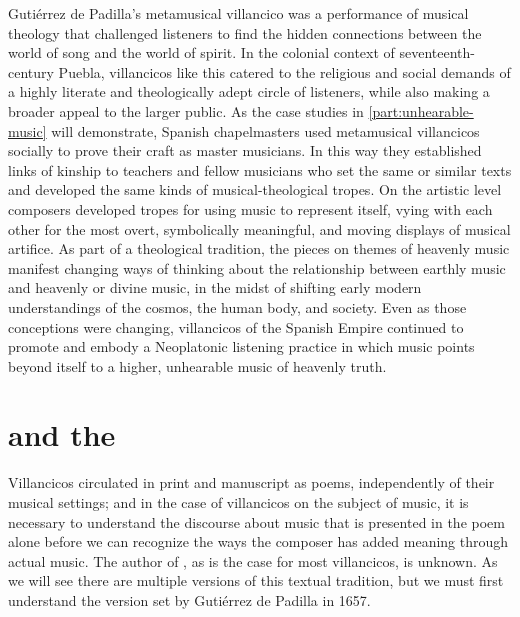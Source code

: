 Gutiérrez de Padilla's metamusical villancico was a performance of musical
theology that challenged listeners to find the hidden connections between the
world of song and the world of spirit.
In the colonial context of seventeenth-century Puebla, villancicos like this
catered to the religious and social demands of a highly literate and
theologically adept circle of listeners, while also making a broader appeal to
the larger public.
As the case studies in \cref{part:unhearable-music} will demonstrate, Spanish
chapelmasters used metamusical villancicos socially to prove their craft as
master musicians.
In this way they established links of kinship to teachers and fellow musicians
who set the same or similar texts and developed the same kinds of
musical-theological tropes.
On the artistic level composers developed tropes for using music to represent
itself, vying with each other for the most overt, symbolically meaningful, and
moving displays of musical artifice.
As part of a theological tradition, the pieces on themes of heavenly music
manifest changing ways of thinking about the relationship between earthly music
and heavenly or divine music, in the midst of shifting early modern
understandings of the cosmos, the human body, and society.
Even as those conceptions were changing, villancicos of the Spanish Empire
continued to promote and embody a Neoplatonic listening practice in which music
points beyond itself to a higher, unhearable music of heavenly truth.

\section{ and the }

Villancicos circulated in print and manuscript as poems, independently of their
musical settings; and in the case of villancicos on the subject of music, it is
necessary to understand the discourse about music that is presented in the poem
alone before we can recognize the ways the composer has added meaning through
actual music.
The author of , as is the case for most
villancicos, is unknown.
As we will see there are multiple versions of this textual tradition, but we
must first understand the version set by Gutiérrez de Padilla in 1657.

